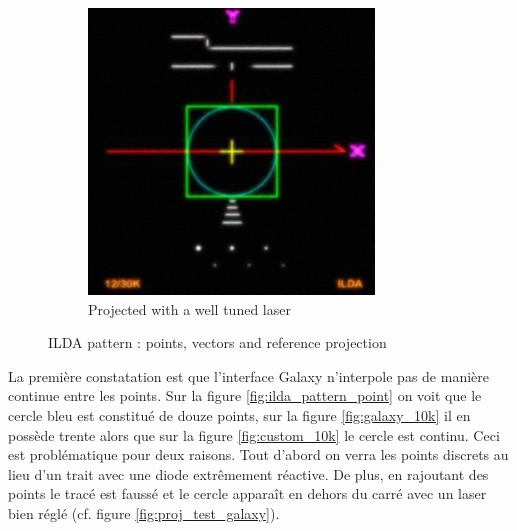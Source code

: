 \begin{en}
\begin{figure}[ht]
\begin{bigcenter}
        \begin{subfigure}[b]{0.6\textwidth}
                \includegraphics[width=\textwidth]{images/comp/mire_reference.jpg}
                \caption{Projected with a well tuned laser}
                \label{fig:ilda_pattern_proj}
        \end{subfigure}     
	\end{bigcenter}
\caption{ILDA pattern : points, vectors and reference projection}
\label{fig:ilda_pattern}
\end{figure}
\end{en}

\begin{en}
\end{en}


\begin{fr}
La première constatation est que l'interface Galaxy n'interpole pas de ma\-nière continue entre les points.
Sur la figure \ref{fig:ilda_pattern_point} on voit que le cercle bleu est constitué de douze points, sur la figure \ref{fig:galaxy_10k} il en possède trente alors que sur la figure \ref{fig:custom_10k} le cercle est continu.
Ceci est problématique pour deux raisons.
Tout d'abord on verra les points discrets au lieu d'un trait avec une diode extrêmement réactive. 
De plus, en rajoutant des points le tracé est faussé et le cercle apparaît en dehors du carré avec un laser bien réglé (cf. figure \ref{fig:proj_test_galaxy}).
\end{fr}

